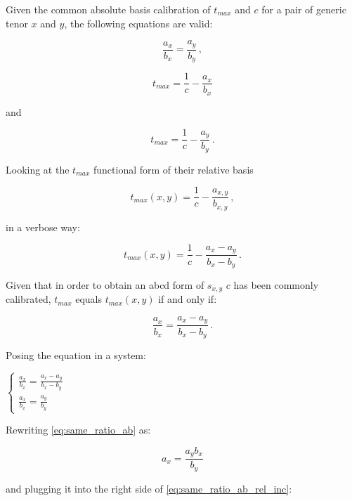 Given the common absolute basis calibration of $t_{max}$ and $c$ for a pair of generic tenor $x$ and $y$, the following equations are valid:

\begin{equation}
    \frac{a_{x}}{b_{x}}=\frac{a_{y}}{b_{y}}\,,
    \label{eq:same_ratio_ab}
\end{equation}

\begin{equation*}
    t_{max}=\frac{1}{c}-\frac{a_{x}}{b_{x}}
\end{equation*}

and

\begin{equation*}
    t_{max}=\frac{1}{c}-\frac{a_{y}}{b_{y}}\,.
\end{equation*}

Looking at the $t_{max}$ functional form of their relative basis

\begin{equation*}
    t_{max}(x,y)=\frac{1}{c}-\frac{a_{x,y}}{b_{x,y}}\,,
\end{equation*}

in a verbose way:

\begin{equation*}
    t_{max}(x,y)=\frac{1}{c}-\frac{a_{x}-a_{y}}{b_{x}-b_{y}}\,.
\end{equation*}

Given that in order to obtain an abcd form of $s_{x,y}$ $c$ has been commonly calibrated, $t_{max}$ equals $t_{max}(x,y)$ if and only if:

\begin{equation}
    \frac{a_{x}}{b_{x}}=\frac{a_{x}-a_{y}}{b_{x}-b_{y}}\,.
    \label{eq:same_ratio_ab_rel_inc}
\end{equation}

Posing the equation in a system:


$\begin{cases} 
\frac{a_{x}}{b_{x}}=\frac{a_{x}-a_{y}}{b_{x}-b_{y}}
\\
\frac{a_{x}}{b_{x}}=\frac{a_{y}}{b_{y}}
\end{cases}$


Rewriting \eqref{eq:same_ratio_ab} as:

\begin{equation*}
    a_{x}=\frac{a_{y}b_{x}}{b_{y}}
\end{equation*}

and plugging it into the right side of \eqref{eq:same_ratio_ab_rel_inc}:

